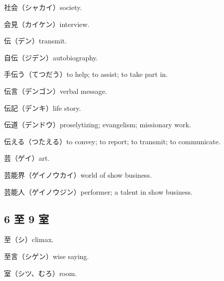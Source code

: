 社会（シャカイ）society.

会見（カイケン）interview.

伝（デン）transmit.

自伝（ジデン）autobiography.

手伝う（てつだう）to help; to assist; to take part in.

伝言（デンゴン）verbal message.

伝記（デンキ）life story.

伝道（デンドウ）proselytizing; evangelism; missionary work.

伝える（つたえる）to convey; to report; to transmit; to communicate.

芸（ゲイ）art.

芸能界（ゲイノウカイ）world of show business.

芸能人（ゲイノウジン）performer; a talent in show business.

\subsection{6 至 9 室}

至（シ）climax.

至言（シゲン）wise saying.

室（シツ、むろ）room.
